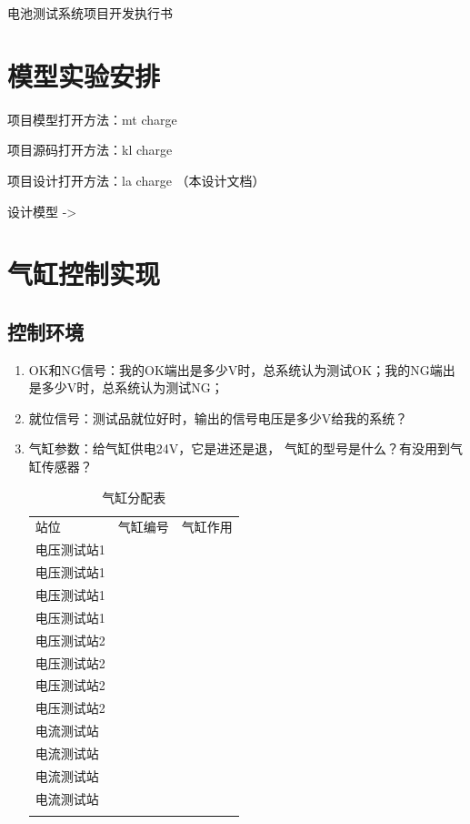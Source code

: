 \documentclass[utf8]{ctexart}
\begin{document}
\begin{bfseries} 
 电池测试系统项目开发执行书
\end{bfseries}

\section {模型实验安排}
项目模型打开方法：mt charge

项目源码打开方法：kl charge

项目设计打开方法：la charge （本设计文档）

设计模型 -> 

\section {气缸控制实现}
\subsection {控制环境}
\begin{enumerate} [1.]
  \setlength{\itemsep}{0.1ex} %
  \setlength{\itemindent}{2em} %
  \item  OK和NG信号：我的OK端出是多少V时，总系统认为测试OK；我的NG端出是多少V时，总系统认为测试NG；   
  \item  就位信号：测试品就位好时，输出的信号电压是多少V给我的系统？
  \item 气缸参数：给气缸供电24V，它是进还是退， 气缸的型号是什么？有没用到气缸传感器？
     \begin{table}[!htbp]
	    \centering
	    \begin{tabular}{|p{4cm}|p{3cm}|p{7cm}|}
	      \Xhline{1.0pt}
	    站位&气缸编号&气缸作用\\  \Xhline{1.0pt}
	    	电压测试站1&&\\ \hline
	    	电压测试站1&&\\ \hline
	    	电压测试站1&&\\ \hline
		电压测试站1&&\\ \Xhline{1.0pt} 

	    	电压测试站2&&\\ \hline
	    	电压测试站2&&\\ \hline
	    	电压测试站2&&\\ \hline
		电压测试站2&&\\ \Xhline{1.0pt}

	    	电流测试站&&\\ \hline
	    	电流测试站&&\\ \hline
	    	电流测试站&&\\ \hline
		电流测试站&&\\  \Xhline{1.0pt}
	    \end{tabular}
	    \caption{气缸分配表}
    \end{table}
     

\end{enumerate}
\end{document}
